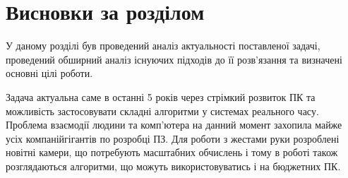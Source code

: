 \section{Висновки за розділом}

У даному розділі був проведений аналіз актуальності поставленої задачі, проведений обширний аналіз існуючих підходів до її розв'язання та визначені основні цілі роботи.

Задача актуальна саме в останні 5 років через стрімкий розвиток ПК та можливість застосовувати складні алгоритми у системах реального часу. Проблема взаємодії людини та комп'ютера на данний момент захопила майже усіх компанійгігантів по розробці ПЗ. Для роботи з жестами руки розроблені новітні камери, що потребують масштабних обчислень і тому в роботі також розглядаються алгоритми, що можуть використовуватись і на бюджетних ПК.